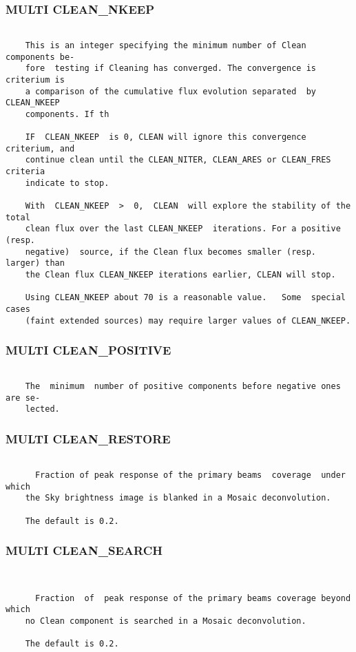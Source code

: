 \subsubsection{MULTI CLEAN\_NKEEP}
\begin{verbatim}

    This is an integer specifying the minimum number of Clean components be-
    fore  testing if Cleaning has converged. The convergence is criterium is
    a comparison of the cumulative flux evolution separated  by  CLEAN_NKEEP
    components. If th

    IF  CLEAN_NKEEP  is 0, CLEAN will ignore this convergence criterium, and
    continue clean until the CLEAN_NITER, CLEAN_ARES or CLEAN_FRES  criteria
    indicate to stop.

    With  CLEAN_NKEEP  >  0,  CLEAN  will explore the stability of the total
    clean flux over the last CLEAN_NKEEP  iterations. For a positive  (resp.
    negative)  source, if the Clean flux becomes smaller (resp. larger) than
    the Clean flux CLEAN_NKEEP iterations earlier, CLEAN will stop.

    Using CLEAN_NKEEP about 70 is a reasonable value.   Some  special  cases
    (faint extended sources) may require larger values of CLEAN_NKEEP.

\end{verbatim}
\subsubsection{MULTI CLEAN\_POSITIVE}
\begin{verbatim}

    The  minimum  number of positive components before negative ones are se-
    lected.

\end{verbatim}
\subsubsection{MULTI CLEAN\_RESTORE}
\begin{verbatim}

      Fraction of peak response of the primary beams  coverage  under  which
    the Sky brightness image is blanked in a Mosaic deconvolution.

    The default is 0.2.

\end{verbatim}
\subsubsection{MULTI CLEAN\_SEARCH}
\begin{verbatim}


      Fraction  of  peak response of the primary beams coverage beyond which
    no Clean component is searched in a Mosaic deconvolution.

    The default is 0.2.

\end{verbatim}
